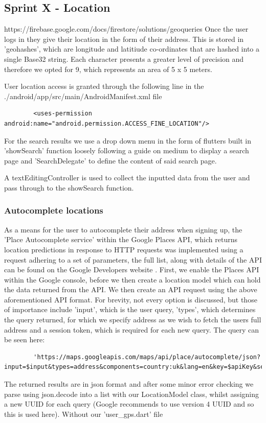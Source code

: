 \documentclass[12pt]{article}
\begin{document}
	\subsection{Sprint X - Location}
	https://firebase.google.com/docs/firestore/solutions/geoqueries
	Once the user logs in they give their location in the form of their address. This is stored in 'geohashes', which are longitude and latitiude co-ordinates that are hashed into a single Base32 string. Each character presents a greater level of precision and therefore we opted for 9, which represents an area of 5 x 5 meters.
	
	User location access is granted through the following line in the ./android/app/src/main/AndroidManifest.xml file
	\begin{lstlisting}
		<uses-permission android:name="android.permission.ACCESS_FINE_LOCATION"/>
	\end{lstlisting}
	For the search results we use a drop down menu in the form of flutters built in 'showSearch' function loosely following a guide on medium \cite{sheanLocationSearchAutocomplete2020} to display a search page and 'SearchDelegate' to define the content of said search page.
	
	A textEditingController is used to collect the inputted data from the user and pass through to the showSearch function.
	
	\noindent
	
	
	
	\subsubsection{Autocomplete locations}
	As a means for the user to autocomplete their address when signing up, the 'Place Autocomplete service' within the Google Places API, which returns location predictions in response to HTTP requests was implemented using a request adhering to a set of parameters, the full list, along with details of the API can be found on the Google Developers website \cite{PlaceAutocompleteRequests}.
	First, we enable the Places API within the Google console, before we then create a location model which can hold the data returned from the API. We then create an API request using the above aforementioned API format. For brevity, not every option is discussed, but those of importance include 'input', which is the user query, 'types', which determines the query returned, for which we specify address as we wish to fetch the users full address and a session token, which is required for each new query. The query can be seen here:
	\begin{lstlisting}
		'https://maps.googleapis.com/maps/api/place/autocomplete/json?input=$input&types=address&components=country:uk&lang=en&key=$apiKey&sessiontoken=$sessionToken'
	\end{lstlisting}
	The returned results are in json format and after some minor error checking we parse using json.decode into a list with our LocationModel class, whilst assigning a new UUID for each query (Google recommends to use version 4 UUID and so this is used here). Without our 'user\_gps.dart' file
	
\end{document}
